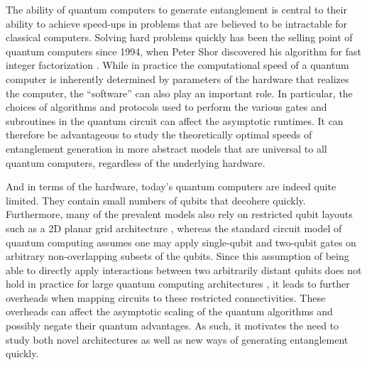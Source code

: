 The ability of quantum computers to generate entanglement is central to their ability to achieve speed-ups in problems that are believed to be intractable for classical computers.
Solving hard problems quickly has been the selling point of quantum computers since 1994, when Peter Shor discovered his algorithm for fast integer factorization \cite{Shor1997}.
While in practice the computational speed of a quantum computer is inherently determined by parameters of the hardware that realizes the computer, the ``software'' can also play an important role.
In particular, the choices of algorithms and protocols used to perform the various gates and subroutines in the quantum circuit can affect the asymptotic runtimes.
It can therefore be advantageous to study the theoretically optimal speeds of entanglement generation in more abstract models that are universal to all quantum computers, regardless of the underlying hardware.

And in terms of the hardware, today's quantum computers are indeed quite limited. They contain small numbers of qubits that decohere quickly. Furthermore, many of the prevalent models also rely on restricted qubit layouts such as a 2D planar grid architecture \cite{Arute2019}, whereas the standard circuit model of quantum computing assumes one may apply single-qubit and two-qubit gates on arbitrary non-overlapping subsets of the qubits.
Since this assumption of being able to directly apply interactions between two arbitrarily distant qubits does not hold in practice for large quantum computing architectures \cite{Monroe2014,Linke2017,Bapat2018,Childs2019c,Schoute2022}, it leads to further overheads when mapping circuits to these restricted connectivities.
These overheads can affect the asymptotic scaling of the quantum algorithms and possibly negate their quantum advantages.
As such, it motivates the need to study both novel architectures as well as new ways of generating entanglement quickly.

